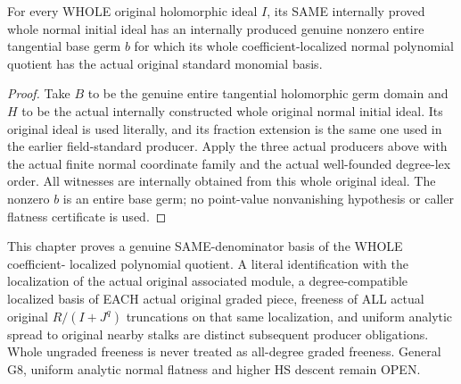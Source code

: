 \begin{theorem}
\label{hir:relative-normal-uniform-original-normal-consumer}
\leanok
{}
For every WHOLE original holomorphic ideal $I$, its SAME internally proved
whole normal initial ideal has an internally produced genuine nonzero
entire tangential base germ $b$ for which its whole coefficient-localized
normal polynomial quotient has the actual original standard monomial basis.
\end{theorem}
\begin{proof}
Take $B$ to be the genuine entire tangential holomorphic germ domain and $H$
to be the actual internally constructed whole original normal initial ideal.
Its original ideal is used literally, and its fraction extension is the same
one used in the earlier field-standard producer. Apply the three actual
producers above with the actual finite normal coordinate family and the
actual well-founded degree-lex order. All witnesses are internally obtained
from this whole original ideal. The nonzero $b$ is an entire base germ; no
point-value nonvanishing hypothesis or caller flatness certificate is used.
\end{proof}

\begin{remark}
This chapter proves a genuine SAME-denominator basis of the WHOLE coefficient-
localized polynomial quotient. A literal identification with the localization
of the actual original associated module, a degree-compatible localized basis
of EACH actual original graded piece, freeness of ALL actual original
$R/(I+J^q)$ truncations on that same localization, and uniform analytic spread
to original nearby stalks are distinct subsequent producer obligations.
Whole ungraded freeness is never treated as all-degree graded freeness.
General G8, uniform analytic normal flatness and higher HS descent remain OPEN.
\end{remark}
